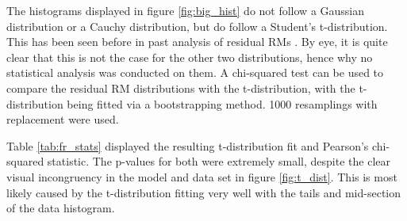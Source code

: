 The histograms displayed in figure \ref{fig:big_hist} do not follow a Gaussian distribution or a Cauchy distribution, but do follow a Student's t-distribution. This has been seen before in past analysis of residual RMs \citep{ID73}. By eye, it is quite clear that this is not the case for the other two distributions, hence why no statistical analysis was conducted on them. A chi-squared test can be used to compare the residual RM distributions with the t-distribution, with the t-distribution being fitted via a bootstrapping method. 1000 resamplings with replacement were used.

Table \ref{tab:fr_stats} displayed the resulting t-distribution fit and Pearson's chi-squared statistic. The p-values for both were extremely small, despite the clear visual incongruency in the model and data set in figure \ref{fig:t_dist}. This is most likely caused by the t-distribution fitting very well with the tails and mid-section of the data histogram.

